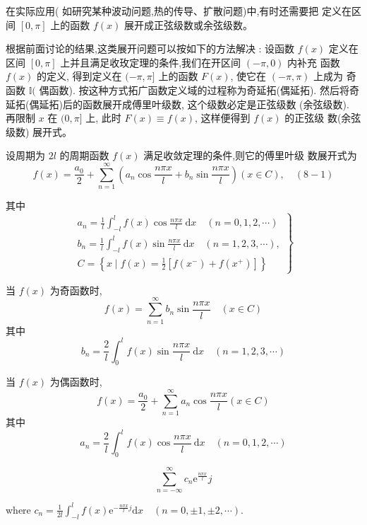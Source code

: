 在实际应用( 如研究某种波动问题,热的传导、扩散问题)中,有时还需要把 定义在区间 $ [0, \pi] $ 上的函数 $ f(x) $ 展开成正弦级数或余弦级数。

根据前面讨论的结果,这类展开问题可以按如下的方法解决 : 设函数 $ f(x) $ 定义在区间 $ [0, \pi] $ 上并且满足收玫定理的条件,我们在开区间 $ (-\pi, 0) $ 内补充 函数 $ f(x) $ 的定义, 得到定义在 $ (-\pi, \pi] $ 上的函数 $ F(x) $, 使它在 $ (-\pi, \pi) $ 上成为 奇函数 $ \mathbb{I}( $ 偶函数). 按这种方式拓广函数定义域的过程称为奇延拓(偶延拓). 然后将奇延拓(偶延拓)后的函数展开成傅里叶级数, 这个级数必定是正弦级数 (余弦级数). 再限制 $ x $ 在 $ (0, \pi] $ 上, 此时 $ F(x) \equiv f(x) $, 这样便得到 $ f(x) $ 的正弦级 数(余弦级数) 展开式。


\begin{theorem}
    设周期为 $ 2 l $ 的周期函数 $ f(x) $ 满足收敛定理的条件,则它的傅里叶级 数展开式为
$$
f(x)=\frac{a_{0}}{2}+\sum_{n=1}^{\infty}\left(a_{n} \cos \frac{n \pi x}{l}+b_{n} \sin \frac{n \pi x}{l}\right)(x \in C), \quad(8-1)
$$

其中
$$
\left.\begin{array}{l}
a_{n}=\frac{1}{l} \int_{-l}^{l} f(x) \cos \frac{n \pi x}{l} \mathrm{~d} x \quad(n=0,1,2, \cdots) \\
b_{n}=\frac{1}{l} \int_{-l}^{l} f(x) \sin \frac{n \pi x}{l} \mathrm{~d} x \quad(n=1,2,3, \cdots), \\
C=\left\{x \mid f(x)=\frac{1}{2}\left[f\left(x^{-}\right)+f\left(x^{+}\right)\right]\right\}
\end{array}\right\}
$$



当 $ f(x) $ 为奇函数时,
$$
f(x)=\sum_{n=1}^{\infty} b_{n} \sin \frac{n \pi x}{l} \quad(x \in C)
$$
其中
$$
b_{n}=\frac{2}{l} \int_{0}^{l} f(x) \sin \frac{n \pi x}{l} \mathrm{~d} x \quad(n=1,2,3, \cdots)
$$

当 $ f(x) $ 为偶函数时,
$$
f(x)=\frac{a_{0}}{2}+\sum_{n=1}^{\infty} a_{n} \cos \frac{n \pi x}{l}(x \in C)
$$
其中
$$
a_{n}=\frac{2}{l} \int_{0}^{l} f(x) \cos \frac{n \pi x}{l} \mathrm{~d} x \quad(n=0,1,2, \cdots)
$$
\end{theorem}

\begin{definition}[傅里叶级数的复数形式]
    $$ \sum_{n=-\infty}^{\infty} c_{n} \mathrm{e}^{\frac{n \pi x}{l}}j $$

    where $c_{n}=\frac{1}{2 l} \int_{-l}^{l} f(x) \mathrm{e}^{-\frac{n \pi x}{l} j} \mathrm{d} x \quad(n=0, \pm 1, \pm 2, \cdots) $.
\end{definition}

